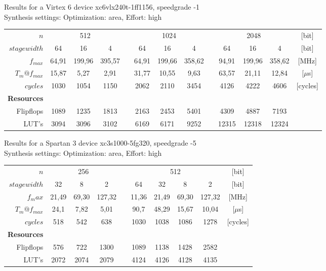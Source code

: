 Results for a Virtex 6 device xc6vlx240t-1ff1156, speedgrade -1\\
Synthesis settings: Optimization: area, Effort: high\\
\begin{tabular}{rcccccccccccc}
\hline
\hline
$n$     & \multicolumn{3}{c}{512} &       & \multicolumn{3}{c}{1024} &       & \multicolumn{3}{c}{2048} & [bit] \bigstrut[t]\\
$stage width$ & 64    & 16    & 4     &       & 64    & 16    & 4     &       & 64    & 16    & 4     & [bit] \bigstrut[b]\\
\hline
$f_{max}$  & 64,91 & 199,96 & 395,57 &       & 64,91 & 199,66 & 358,62 &       & 94,91 & 199,96 & 358,62 & [MHz] \bigstrut[t]\\
$T_m@f_{max}$ & 15,87 & 5,27  & 2,91  &       & 31,77 & 10,55 & 9,63  &       & 63,57 & 21,11 & 12,84 & [$\mu$s] \\
$cycles$ & 1030  & 1054  & 1150  &       & 2062  & 2110  & 3454  &       & 4126  & 4222  & 4606  & [cycles] \\
\textbf{Resources} &       &       &       &       &       &       &       &       &       &       &       &  \\
Flipflops & 1089  & 1235  & 1813  &       & 2163  & 2453  & 5401  &       & 4309  & 4887  & 7193  &  \\
LUT's & 3094  & 3096  & 3102  &       & 6169  & 6171  & 9252  &       & 12315 & 12318 & 12324 &  \bigstrut[b]\\
\hline
\hline
\end{tabular}%
\vspace{1cm}
\newline
Results for a Spartan 3 device xc3s1000-5fg320, speedgrade -5\\
Synthesis settings: Optimization: area, Effort: high\\
\begin{tabular}{rccccccccc}
\hline
\hline
$n$     & \multicolumn{3}{c}{256} & & \multicolumn{4}{c}{512}       & [bit] \bigstrut[t]\\
$stage width$ & 32    & 8     & 2    & & 64    & 32    & 8     & 2     & [bit] \bigstrut[b]\\
\hline
$f_max$  & 21,49 & 69,30 & 127,32 & & 11,36 & 21,49 & 69,30 & 127,32 & [MHz] \bigstrut[t]\\
$T_m@f_{max}$ & 24,1  & 7,82  & 5,01  & & 90,7  & 48,29 & 15,67 & 10,04 & [$\mu$s] \\
$cycles$ & 518   & 542   & 638 &  & 1030  & 1038  & 1086  & 1278  & [cycles] \\
\textbf{Resources} &       &    &   &       &       &       &       &       &  \\
Flipflops & 576   & 722   & 1300 & & 1089  & 1138  & 1428  & 2582  &  \\
LUT's & 2072  & 2074  & 2079 & & 4124  & 4126  & 4128  & 4135  &  \bigstrut[b]\\
\hline
\hline
\end{tabular}%
